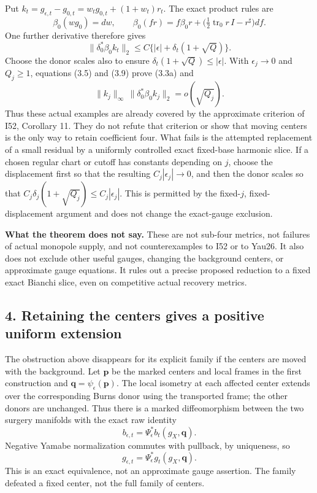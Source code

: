 \documentclass[
  10pt,
]{article}
\begin{document}
Put \(k_t=g_{\epsilon,t}-g_{0,t}  =w_tg_{0,t}+(1+w_t)r_t\). The exact
product rules are \[
 \beta_0(wg_0)=dw,\qquad
 \beta_0(fr)=f\beta_0r+
       \bigl(\tfrac12\operatorname{tr}_0r\,I-r^\sharp\bigr)df .
\] One further derivative therefore gives \[
 \|\delta_0^*\beta_0 k_t\|_2
    \le C\{|\epsilon|+\delta_t(1+\sqrt Q)\}.           \tag{3.9}
\] Choose the donor scales also to ensure
\(\delta_t(1+\sqrt Q)\le|\epsilon|\). With \(\epsilon_j\to0\) and
\(Q_j\ge1\), equations (3.5) and (3.9) prove (3.3a) and \[
 \|k_j\|_\infty\,
       \|\delta_0^*\beta_0 k_j\|_2=o(\sqrt{Q_j}).       \tag{3.10}
\] Thus these actual examples are already covered by the approximate
criterion of I52, Corollary 11. They do not refute that criterion or
show that moving centers is the only way to retain coefficient four.
What fails is the attempted replacement of a small residual by a
uniformly controlled exact fixed-base harmonic slice. If a chosen
regular chart or cutoff has constants depending on \(j\), choose the
displacement first so that the resulting \(C_j|\epsilon_j|\to0\), and
then the donor scales so that
\(C_j\delta_j(1+\sqrt{Q_j})\le C_j|\epsilon_j|\). This is permitted by
the fixed-\(j\), fixed-displacement argument and does not change the
exact-gauge exclusion.

\textbf{What the theorem does not say.} These are not sub-four metrics,
not failures of actual monopole supply, and not counterexamples to I52
or to Yau26. It also does not exclude other useful gauges, changing the
background centers, or approximate gauge equations. It rules out a
precise proposed reduction to a fixed exact Bianchi slice, even on
competitive actual recovery metrics.

\hypertarget{retaining-the-centers-gives-a-positive-uniform-extension}{%
\subsection{4. Retaining the centers gives a positive uniform
extension}\label{retaining-the-centers-gives-a-positive-uniform-extension}}

The obstruction above disappears for its explicit family if the centers
are moved with the background. Let \(\mathbf p\) be the marked centers
and local frames in the first construction and
\(\mathbf q=\psi_\epsilon(\mathbf p)\). The local isometry at each
affected center extends over the corresponding Burns donor using the
transported frame; the other donors are unchanged. Thus there is a
marked diffeomorphism between the two surgery manifolds with the exact
raw identity \[
 b_{\epsilon,t}
     =\Psi_\epsilon^*b_t(g_X,\mathbf q).                       \tag{4.1}
\] Negative Yamabe normalization commutes with pullback, by uniqueness,
so \[
 g_{\epsilon,t}
     =\Psi_\epsilon^*g_t(g_X,\mathbf q).                       \tag{4.2}
\] This is an exact equivalence, not an approximate gauge assertion. The
family defeated a fixed center, not the full family of centers.
\end{document}
